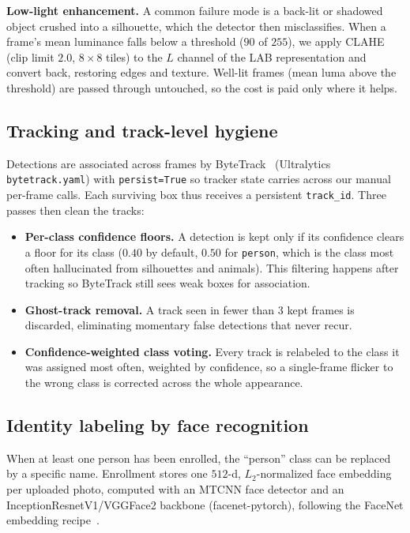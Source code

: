 \documentclass[conference]{IEEEtran}
\begin{document}
\textbf{Low-light enhancement.} A common failure mode is a back-lit or
shadowed object crushed into a silhouette, which the detector then
misclassifies. When a frame's mean luminance falls below a threshold
($90$ of $255$), we apply CLAHE~\cite{clahe} (clip limit $2.0$, $8\times8$
tiles) to the $L$ channel of the LAB representation and convert back,
restoring edges and texture. Well-lit frames (mean luma above the
threshold) are passed through untouched, so the cost is paid only where
it helps.

\subsection{Tracking and track-level hygiene}
Detections are associated across frames by ByteTrack~\cite{bytetrack}
(Ultralytics \texttt{bytetrack.yaml}) with \texttt{persist=True} so
tracker state carries across our manual per-frame calls. Each surviving
box thus receives a persistent \texttt{track\_id}. Three passes then
clean the tracks:
\begin{itemize}
  \item \textbf{Per-class confidence floors.} A detection is kept only
  if its confidence clears a floor for its class ($0.40$ by default,
  $0.50$ for \texttt{person}, which is the class most often hallucinated
  from silhouettes and animals). This filtering happens after tracking
  so ByteTrack still sees weak boxes for association.
  \item \textbf{Ghost-track removal.} A track seen in fewer than $3$
  kept frames is discarded, eliminating momentary false detections that
  never recur.
  \item \textbf{Confidence-weighted class voting.} Every track is
  relabeled to the class it was assigned most often, weighted by
  confidence, so a single-frame flicker to the wrong class is corrected
  across the whole appearance.
\end{itemize}

\subsection{Identity labeling by face recognition}
When at least one person has been enrolled, the ``person'' class can be
replaced by a specific name. Enrollment stores one $512$-d, $L_2$-normalized
face embedding per uploaded photo, computed with an MTCNN face detector
and an InceptionResnetV1/VGGFace2 backbone (facenet-pytorch), following
the FaceNet embedding recipe~\cite{facenet,vggface2}.
\end{document}
